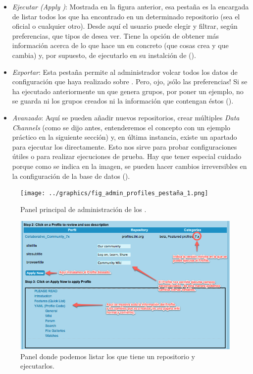 \begin{itemize}
    \item \textit{Ejecutar \profiles{} (Apply \profiles{})}: Mostrada en la figura anterior, esa pestaña es la encargada de listar todos los \profiles{} que ha encontrado \tiki{} en un determinado repositorio (sea el oficial o cualquier otro). Desde aquí el usuario puede elegir y filtrar, según preferencias, que tipos de \profiles{} desea ver. Tiene la opción de obtener más información acerca de lo que hace un \profile{} en concreto (que cosas crea y que cambia) y, por supuesto, de ejecutarlo en su instalción de \tiki{} ().

\item \textit{Exportar}: Esta pestaña permite al administrador volcar todos los datos de configuración que haya realizado sobre \tiki{}. Pero, ojo, ¡sólo las preferencias! Si se ha ejecutado anteriormente un \profile{} que genera grupos, por poner un ejemplo, no se guarda ni los grupos creados ni la información que contengan éstos ().

\item \textit{Avanzado}: Aquí se pueden añadir nuevos repositorios, crear múltiples \textit{Data Channels} (como se dijo antes, entenderemos el concepto con un ejemplo práctico en la siguiente sección) y, en última instancia, existe un apartado para ejecutar los \profiles{} directamente. Esto nos sirve para probar configuraciones útiles o para realizar ejecuciones de prueba. Hay que tener especial cuidado porque como se indica en la imagen, se pueden hacer cambios irreversibles en la configuración de la base de datos ().
\end{itemize}

\begin{figure}
\centering
\texttt{[image: ../graphics/fig\_admin\_profiles\_pestaña\_1.png]}
\caption{Panel principal de administración de los \profiles{}.}
\label{fig:admin_profiles_pestaña_1}
\end{figure}

\begin{figure}
\centering
\includegraphics[width=\linewidth]{../graphics/fig_ejecucion_profile.png}
\caption{Panel donde podemos listar los \profiles{} que tiene un repositorio y ejecutarlos.}\label{fig:ejecucion_profile}
\end{figure}

